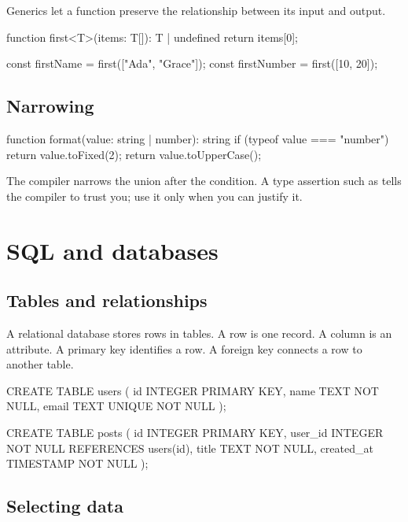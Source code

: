 \documentclass[11pt,openany,oneside]{book}
\newcommand{\inlinecode}[1]{\texttt{\small\detokenize{#1}}}
\begin{document}
Generics let a function preserve the relationship between its input and output.

\begin{code}[language=TypeScript]
function first<T>(items: T[]): T | undefined {
  return items[0];
}

const firstName = first(["Ada", "Grace"]);
const firstNumber = first([10, 20]);
\end{code}

\section{Narrowing}

\begin{code}[language=TypeScript]
function format(value: string | number): string {
  if (typeof value === "number") {
    return value.toFixed(2);
  }
  return value.toUpperCase();
}
\end{code}

The compiler narrows the union after the condition. A type assertion such as \inlinecode{value as User} tells the compiler to trust you; use it only when you can justify it.

\chapter{SQL and databases}

\section{Tables and relationships}

A relational database stores rows in tables. A row is one record. A column is an attribute. A primary key identifies a row. A foreign key connects a row to another table.

\begin{code}[language=SQL]
CREATE TABLE users (
    id INTEGER PRIMARY KEY,
    name TEXT NOT NULL,
    email TEXT UNIQUE NOT NULL
);

CREATE TABLE posts (
    id INTEGER PRIMARY KEY,
    user_id INTEGER NOT NULL REFERENCES users(id),
    title TEXT NOT NULL,
    created_at TIMESTAMP NOT NULL
);
\end{code}

\section{Selecting data}
\end{document}
